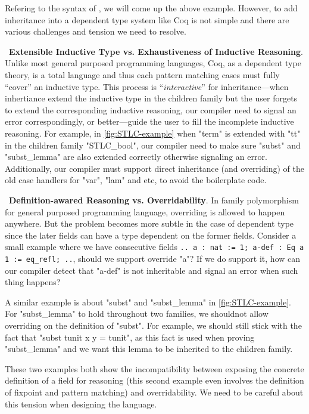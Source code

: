Refering to the syntax of \citet{zm2017}, we will come up the above example. However, to add inheritance into a dependent type system like Coq is not simple and there are various challenges and tension we need to resolve. 


~\textbf{Extensible Inductive Type vs. Exhaustiveness of Inductive Reasoning}. Unlike most general purposed programming languages, Coq, as a dependent type theory, is a total language and thus each pattern matching cases must fully ``cover'' an inductive type. This process is ``\textit{interactive}'' for inheritance---when inhertiance extend the inductive type in the children family but the user forgets to extend the corresponding inductive reasoning, our compiler need to signal an error correspondingly, or better---guide the user to fill the incomplete inductive reasoning. For example, in \cref{fig:STLC-example} when "term" is extended with "tt" in the children family "STLC_bool", our compiler need to make sure "subst" and "subst_lemma" are also extended correctly otherwise signaling an error.
Additionally, our compiler must support direct inheritance (and overriding) of the old case handlers for "var", "lam" and etc, to avoid the boilerplate code. 


~\textbf{Definition-awared Reasoning vs. Overridability}. In family polymorphism for general purposed programming language, overriding is allowed to happen anywhere. But the problem becomes more subtle in the case of dependent type since the later fields can have a type dependent on the former fields.  Consider a small example where we have consecutive fields \texttt{{.. a : nat := 1; a-def : Eq a 1 := eq_refl; ..}}, should we support override "a"? If we do support it, how can our compiler detect that "a-def" is not inheritable and signal an error when such thing happens? 

A similar example is about "subst" and "subst_lemma" in \cref{fig:STLC-example}. For "subst_lemma" to hold throughout two families, we shouldnot allow overriding on the definition of "subst". For example, we should still stick with the fact that "subst tunit x y = tunit", as this fact is used when proving "subst_lemma" and we want this lemma to be inherited to the children family.

These two examples both show the incompatibility between exposing the concrete definition of a field for reasoning (this second example even involves the definition of fixpoint and pattern matching) and overridability. We need to be careful about this tension when designing the language.

